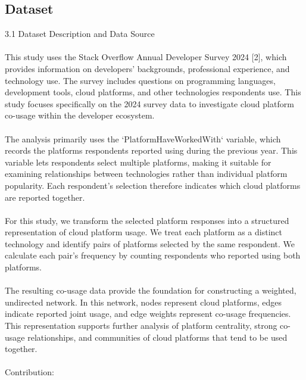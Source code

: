 \documentclass{article}
\begin{document}
\begin{itemize}
{\subsection{Dataset}
{\color{red}
3.1 Dataset Description and Data Source
\\\\
This study uses the Stack Overflow Annual Developer Survey 2024 [2], which provides information on developers' backgrounds, professional experience, and technology use. The survey includes questions on programming languages, development tools, cloud platforms, and other technologies respondents use. This study focuses specifically on the 2024 survey data to investigate cloud platform co-usage within the developer ecosystem.
\\\\
The analysis primarily uses the `PlatformHaveWorkedWith` variable, which records the platforms respondents reported using during the previous year. This variable lets respondents select multiple platforms, making it suitable for examining relationships between technologies rather than individual platform popularity. Each respondent's selection therefore indicates which cloud platforms are reported together.
\\\\
For this study, we transform the selected platform responses into a structured representation of cloud platform usage. We treat each platform as a distinct technology and identify pairs of platforms selected by the same respondent. We calculate each pair's frequency by counting respondents who reported using both platforms.
\\\\
The resulting co-usage data provide the foundation for constructing a weighted, undirected network. In this network, nodes represent cloud platforms, edges indicate reported joint usage, and edge weights represent co-usage frequencies. This representation supports further analysis of platform centrality, strong co-usage relationships, and communities of cloud platforms that tend to be used together.
\\\\
Contribution:

}}
\end{itemize}
\end{document}

